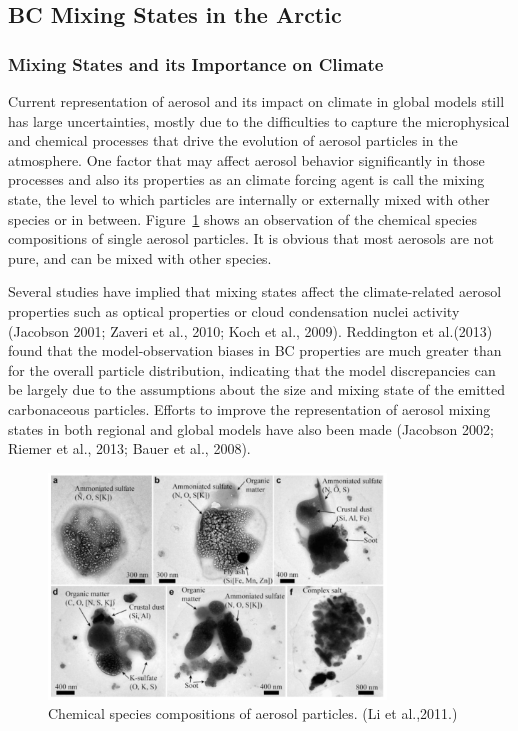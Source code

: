 \documentclass[12pt]{article}
\begin{document}
	\subsection{BC Mixing States in the Arctic}
	\subsubsection{Mixing States and its Importance on Climate}
		Current representation of aerosol and its impact on climate in global models still has large uncertainties, mostly due to the difficulties to capture the microphysical and chemical processes that drive the evolution of aerosol particles in the atmosphere. One factor that may affect aerosol behavior significantly in those processes and also its properties as an climate forcing agent is call the mixing state, the level to which particles are internally or externally mixed with other species or in between. Figure~\ref{fig_P5} shows an observation of the chemical species compositions of single aerosol particles. It is obvious that most aerosols are not pure, and can be mixed with other species. 
		
		Several studies have implied that mixing states affect the climate-related aerosol properties such as optical properties or cloud condensation nuclei activity (Jacobson 2001; Zaveri et al., 2010; Koch et al., 2009). Reddington et al.(2013) found that the model-observation biases in BC properties are much greater than for the overall particle distribution, indicating that the model discrepancies can be largely due to the assumptions about the size and mixing state of the emitted carbonaceous particles. Efforts to improve the representation of aerosol mixing states in both regional and global models have also been made (Jacobson 2002; Riemer et al., 2013; Bauer et al., 2008).
	 
	\begin{figure}[H] 
		\begin{center}
			\includegraphics[width = 0.8\textwidth]{Figure05}
			\caption[]{\label{fig_P5} Chemical species compositions of aerosol particles. (Li et al.,2011.)}
		\end{center}
	\end{figure}
	
\end{document}
